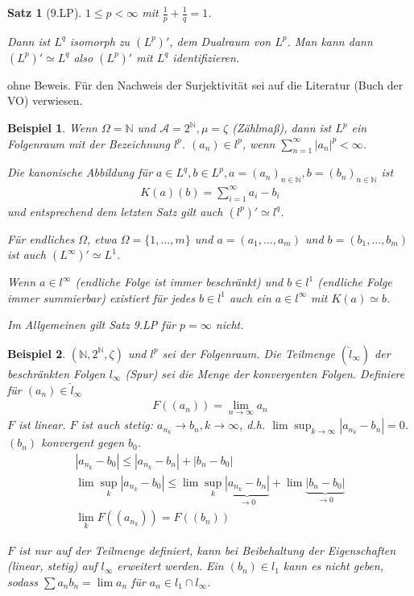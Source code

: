 \documentclass[]{article}
\newtheorem{theorem}{Satz}
\newtheorem*{example}{Beispiel}
\begin{document}
\begin{theorem}[9.LP]
	$1\leq p < \infty$ mit $\frac{1}{p} + \frac{1}{q} = 1$.
	
	Dann ist $L^q$ isomorph zu $(L^p)'$, dem Dualraum von $L^p$. Man kann dann $(L^p)' \simeq L^q$ also $(L^p)'$ mit $L^q$ identifizieren.
\end{theorem}

ohne Beweis. Für den Nachweis der Surjektivität sei auf die Literatur (Buch der VO) verwiesen.

\begin{example}
	Wenn $\Omega = \mathbb{N}$ und $\mathcal{A}=2^\mathbb{N}, \mu = \zeta$ (Zählmaß), dann ist $L^p$ ein Folgenraum mit der Bezeichnung $l^p$. $(a_n)\in l^p$, wenn $\sum_{n=1}^{\infty}|a_n|^p < \infty$.
	
	Die kanonische Abbildung für $a \in L^q, b \in L^p, a=(a_n)_{n\in \mathbb{N}}, b = (b_n)_{n\in \mathbb{N}}$ ist
	\begin{align*}
		K(a)(b) = \sum_{i=1}^{\infty} a_i - b_i
	\end{align*}
	und entsprechend dem letzten Satz gilt auch $(l^p)' \simeq l^q$.
	
	Für endliches $\Omega$, etwa $\Omega = \{1,...,m\}$ und $a=(a_1,...,a_m)$ und $b=(b_1,...,b_m)$ ist auch $(L^\infty)' \simeq L^1$.
	
	Wenn $a\in l^\infty$ (endliche Folge ist immer beschränkt) und $b \in l^1$ (endliche Folge immer summierbar) existiert für jedes $b \in l^1$ auch ein $a\in l^\infty$ mit $K(a) \simeq b$.
	
	Im Allgemeinen gilt Satz 9.LP für $p = \infty$ nicht.
\end{example}

\begin{example}
	$(\mathbb{N}, 2^\mathbb{N}, \zeta)$ und $l^p$ sei der Folgenraum. Die Teilmenge $(\hat{l}_\infty)$ der beschränkten Folgen $l_\infty$ (Spur) sei die Menge der konvergenten Folgen. Definiere für $(a_n) \in \hat{l}_\infty$
	\begin{align*}
		F((a_n)) = \lim\limits_{n\rightarrow\infty} a_n
	\end{align*}
	$F$ ist linear. $F$ ist auch stetig:
	$a_{n_k} \rightarrow b_n, k\rightarrow\infty$, d.h. $\lim\sup_{k\rightarrow\infty} |a_{n_k}-b_n| = 0$. $(b_n)$ konvergent gegen $b_0$.
	\begin{align*}
		|a_{n_k} - b_0| \leq |a_{n_k} - b_n| + |b_n - b_0|\\
		\lim\sup_k |a_{n_k} - b_0| \leq \lim\sup_k \underbrace{|a_{n_k} - b_n|}_{\rightarrow0} + \lim \underbrace{|b_n - b_0|}_{\rightarrow 0}\\
		\lim_k F((a_{n_k})) = F((b_n))
	\end{align*}

	$F$ ist nur auf der Teilmenge definiert, kann bei Beibehaltung der Eigenschaften (linear, stetig) auf $l_\infty$ erweitert werden. Ein $(b_n) \in l_1$ kann es nicht geben, sodass $\sum a_n b_n = \lim a_n$ für $a_n \in l_1 \cap l_\infty$.
\end{example}
\end{document}
